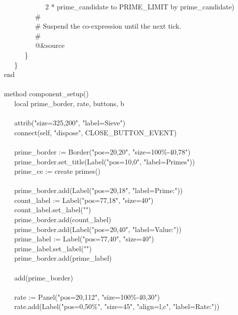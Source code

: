{\>   \ \ \ \ \ \ \ \ \ \ \ \ 2 * prime\_candidate to PRIME\_LIMIT by prime\_candidate) \\
\>   \ \ \ \ \ \ \ \ \ \# \\
\>   \ \ \ \ \ \ \ \ \ \# Suspend the co-expression until the next
tick. \\
\>   \ \ \ \ \ \ \ \ \ \# \\
\>   \ \ \ \ \ \ \ \ \ @\&source \\
\>   \ \ \ \ \ \ \} \\
\>   \ \ \ \} \\
\>   end \\
\ \\
\>   method component\_setup() \\
\>   \ \ \ local prime\_border, rate, buttons, b \\
\ \\
\>   \ \ \ attrib("size=325,200",
"label=Sieve") \\
\>   \ \ \ connect(self, "dispose",
CLOSE\_BUTTON\_EVENT) \\
\ \\
\>   \ \ \ prime\_border :=
Border("pos=20,20",
"size=100\%-40,78") \\
\>   \ \ \ prime\_border.set\_title(Label("pos=10,0",
"label=Primes")) \\
\>   \ \ \ prime\_ce := create primes() \\
\ \\
\>   \ \ \ prime\_border.add(Label("pos=20,18",
"label=Prime:")) \\
\>   \ \ \ count\_label :=
Label("pos=77,18",
"size=40") \\
\>   \ \ \ count\_label.set\_label("") \\
\>   \ \ \ prime\_border.add(count\_label) \\
\>   \ \ \ prime\_border.add(Label("pos=20,40",
"label=Value:")) \\
\>   \ \ \ prime\_label :=
Label("pos=77,40",
"size=40") \\
\>   \ \ \ prime\_label.set\_label("") \\
\>   \ \ \ prime\_border.add(prime\_label) \\
\ \\
\>   \ \ \ add(prime\_border) \\
\ \\
\>   \ \ \ rate := Panel("pos=20,112",
"size=100\%-40,30") \\
\>   \ \ \ rate.add(Label("pos=0,50\%",
"size=45",
"align=l,c",
"label=Rate:")) \\
}
